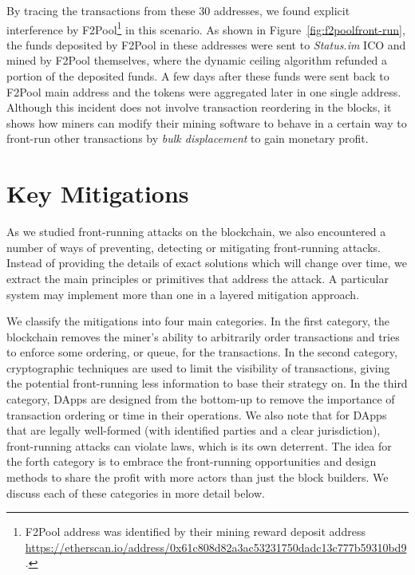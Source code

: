 
By tracing the transactions from these 30 addresses, we found explicit interference by F2Pool\footnote{F2Pool address was identified by their mining reward deposit address \url{https://etherscan.io/address/0x61c808d82a3ac53231750dadc13c777b59310bd9}.} in this scenario. As shown in Figure~\ref{fig:f2poolfront-run}, the funds deposited by F2Pool in these addresses were sent to \textit{Status.im} ICO and mined by F2Pool themselves, where the dynamic ceiling algorithm refunded a portion of the deposited funds. A few days after these funds were sent back to F2Pool main address and the tokens were aggregated later in one single address. Although this incident does not involve transaction reordering in the blocks, it shows how miners can modify their mining software to behave in a certain way to front-run other transactions by \textit{bulk displacement} to gain monetary profit.




\section{Key Mitigations} %




As we studied front-running attacks on the blockchain, we also encountered a number of ways of preventing, detecting or mitigating front-running attacks. Instead of providing the details of exact solutions which will change over time, we extract the main principles or primitives that address the attack. A particular system may implement more than one in a layered mitigation approach.

We classify the mitigations into four main categories. In the first category, the blockchain removes the miner's ability to arbitrarily order transactions and tries to enforce some ordering, or queue, for the transactions. In the second category, cryptographic techniques are used to limit the visibility of transactions, giving the potential front-running less information to base their strategy on. In the third category, DApps are designed from the bottom-up to remove the importance of transaction ordering or time in their operations. We also note that for DApps that are legally well-formed (\eg with identified parties and a clear jurisdiction), front-running attacks can violate laws, which is its own deterrent. The idea for the forth category is to embrace the front-running opportunities and design methods to share the profit with more actors than just the block builders. We discuss each of these categories in more detail below.

